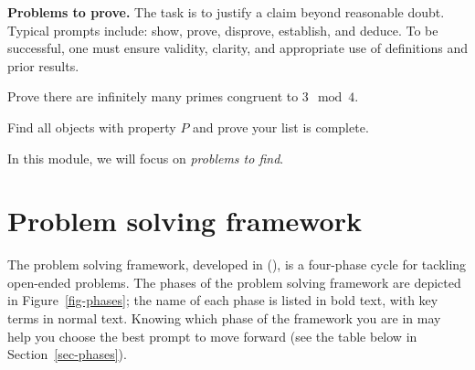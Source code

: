 \documentclass[
  a4paper,
  DIV=11,
  numbers=noendperiod,
  oneside]{scrreprt}
\begin{document}
\textbf{Problems to prove.} The task is to justify a claim beyond
reasonable doubt. Typical prompts include: show, prove, disprove,
establish, and deduce. To be successful, one must ensure validity,
clarity, and appropriate use of definitions and prior results.

\begin{tcolorbox}[enhanced jigsaw, breakable, colframe=quarto-callout-note-color-frame, leftrule=.75mm, arc=.35mm, toptitle=1mm, rightrule=.15mm, left=2mm, colbacktitle=quarto-callout-note-color!10!white, bottomtitle=1mm, titlerule=0mm, bottomrule=.15mm, toprule=.15mm, coltitle=black, opacityback=0, title=\textcolor{quarto-callout-note-color}{\faInfo}\hspace{0.5em}{Example of a problem to prove}, opacitybacktitle=0.6, colback=white]

Prove there are infinitely many primes congruent to \(3 \mod 4\).

\end{tcolorbox}

\begin{tcolorbox}[enhanced jigsaw, breakable, colframe=quarto-callout-warning-color-frame, leftrule=.75mm, arc=.35mm, toptitle=1mm, rightrule=.15mm, left=2mm, colbacktitle=quarto-callout-warning-color!10!white, bottomtitle=1mm, titlerule=0mm, bottomrule=.15mm, toprule=.15mm, coltitle=black, opacityback=0, title=\textcolor{quarto-callout-warning-color}{\faExclamationTriangle}\hspace{0.5em}{Many tasks mix both!}, opacitybacktitle=0.6, colback=white]

Find all objects with property \(P\) and prove your list is complete.

\end{tcolorbox}

In this module, we will focus on \emph{problems to find}.

\section{Problem solving framework}\label{problem-solving-framework}

The problem solving framework, developed in
(), is a four-phase cycle for
tackling open-ended problems. The phases of the problem solving
framework are depicted in Figure~\ref{fig-phases}; the name of each
phase is listed in bold text, with key terms in normal text. Knowing
which phase of the framework you are in may help you choose the best
prompt to move forward (see the table below in
Section~\ref{sec-phases}).
\end{document}
